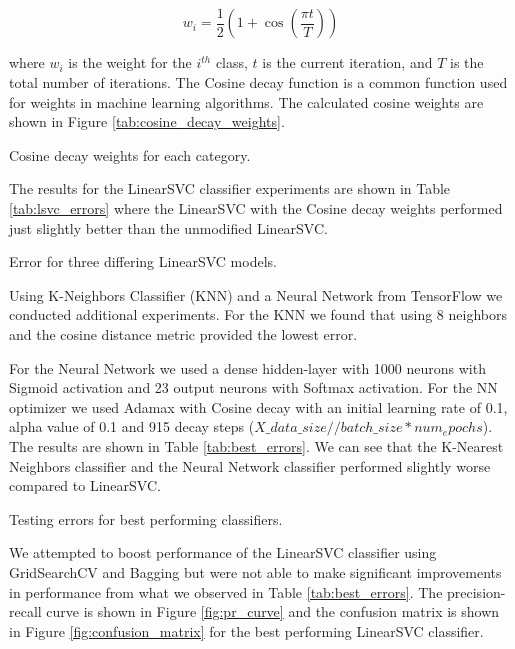 \begin{equation}
    w_i = \frac{1}{2} \left(1 + \cos \left(\frac{\pi t}{T}\right)\right)
\label{eq:cosine_decay}
\end{equation}

where $w_i$ is the weight for the $i^{th}$ class, $t$ is the current iteration, and $T$ is the total number of iterations. The Cosine decay function is a common function used for weights in machine learning algorithms. The calculated cosine weights are shown in Figure \ref{tab:cosine_decay_weights}.

\begin{table}[!ht]
\centering
\caption{Cosine decay weights for each category.}

\label{tab:cosine_decay_weights}
\end{table}

The results for the LinearSVC classifier experiments are shown in Table \ref{tab:lsvc_errors} where the LinearSVC with the Cosine decay weights performed just slightly better than the unmodified LinearSVC.

\begin{table}[!ht]
\centering
\caption{Error for three differing LinearSVC models.}

\label{tab:lsvc_errors}
\end{table}

Using K-Neighbors Classifier (KNN) and a Neural Network from TensorFlow we conducted additional experiments. For the KNN we found that using 8 neighbors and the cosine distance metric provided the lowest error. 

For the Neural Network we used a dense hidden-layer with 1000 neurons with Sigmoid activation and 23 output neurons with Softmax activation. For the NN optimizer we used Adamax with Cosine decay with an initial learning rate of 0.1, alpha value of 0.1 and 915 decay steps ($X\_data\_size // batch\_size * num_epochs$). The results are shown in Table \ref{tab:best_errors}. We can see that the K-Nearest Neighbors classifier and the Neural Network classifier performed slightly worse compared to LinearSVC.

\begin{table}[!ht]
\centering
\caption{Testing errors for best performing classifiers.}

\label{tab:best_errors}
\end{table}

We attempted to boost performance of the LinearSVC classifier using GridSearchCV and Bagging but were not able to make significant improvements in performance from what we observed in Table \ref{tab:best_errors}. The precision-recall curve is shown in Figure \ref{fig:pr_curve} and the confusion matrix is shown in Figure \ref{fig:confusion_matrix} for the best performing LinearSVC classifier.

